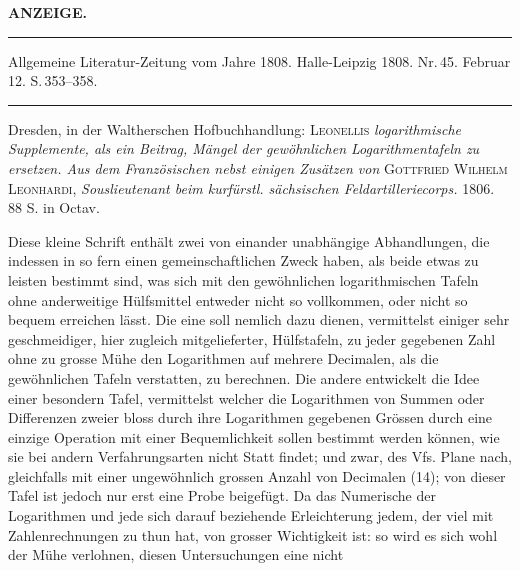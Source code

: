 \begin{center}
\textbf{ANZEIGE.}
\end{center}

\medskip
\noindent\rule{\linewidth}{.3pt}

\noindent Allgemeine Literatur-Zeitung vom Jahre 1808. Halle-Leipzig 1808. Nr.\,45. Februar 12. S.\,353--358.

\noindent\rule{\linewidth}{.3pt}
\medskip

Dresden, in der Waltherschen Hofbuchhandlung: \textsc{Leonellis} \emph{logarithmische Supplemente, als ein Beitrag, Mängel der gewöhnlichen Logarithmentafeln zu ersetzen. Aus dem Französischen nebst einigen Zusätzen von} \textsc{Gottfried Wilhelm Leonhardi}, \emph{Souslieutenant beim kurfürstl. sächsischen Feldartilleriecorps.} 1806. 88 S. in Octav.

Diese kleine Schrift enthält zwei von einander unabhängige Abhandlungen, die indessen in so fern einen gemeinschaftlichen Zweck haben, als beide etwas zu leisten bestimmt sind, was sich mit den gewöhnlichen logarithmischen Tafeln ohne anderweitige Hülfsmittel entweder nicht so vollkommen, oder nicht so bequem erreichen lässt. Die eine soll nemlich dazu dienen, vermittelst einiger sehr geschmeidiger, hier zugleich mitgelieferter, Hülfstafeln, zu jeder gegebenen Zahl ohne zu grosse Mühe den Logarithmen auf mehrere Decimalen, als die gewöhnlichen Tafeln verstatten, zu berechnen. Die andere entwickelt die Idee einer besondern Tafel, vermittelst welcher die Logarithmen von Summen oder Differenzen zweier bloss durch ihre Logarithmen gegebenen Grössen durch eine einzige Operation mit einer Bequemlichkeit sollen bestimmt werden können, wie sie bei andern Verfahrungsarten nicht Statt findet; und zwar, des Vfs. Plane nach, gleichfalls mit einer ungewöhnlich grossen Anzahl von Decimalen (14); von dieser Tafel ist jedoch nur erst eine Probe beigefügt. Da das Numerische der Logarithmen und jede sich darauf beziehende Erleichterung jedem, der viel mit Zahlenrechnungen zu thun hat, von grosser Wichtigkeit ist: so wird es sich wohl der Mühe verlohnen, diesen Untersuchungen eine nicht
